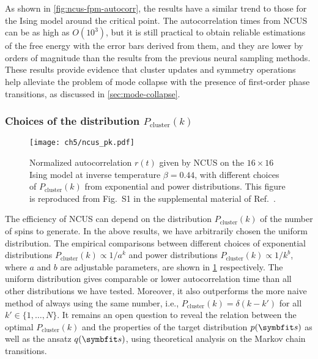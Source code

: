 As shown in \cref{fig:ncus-fpm-autocorr}, the results have a similar trend to those for the Ising model around the critical point. The autocorrelation times from NCUS can be as high as $O(10^3)$, but it is still practical to obtain reliable estimations of the free energy with the error bars derived from them, and they are lower by orders of magnitude than the results from the previous neural sampling methods. These results provide evidence that cluster updates and symmetry operations help alleviate the problem of mode collapse with the presence of first-order phase transitions, as discussed in \cref{sec:mode-collapse}.

\subsubsection{Choices of the distribution $P_\text{cluster}(k)$}

\begin{figure}[htb]
\centering
\texttt{[image: ch5/ncus\_pk.pdf]}
\caption[Choices of the distribution $P_\text{cluster}(k)$ in NCUS]{
Normalized autocorrelation $r(t)$ given by NCUS on the $16 \times 16$ Ising model at inverse temperature $\beta = 0.44$, with different choices of $P_\text{cluster}(k)$ from exponential and power distributions.
This figure is reproduced from Fig.~S1 in the supplemental material of Ref.~\cite{wu2021unbiased}.
}
\label{fig:ncus-pk}
\end{figure}

The efficiency of NCUS can depend on the distribution $P_\text{cluster}(k)$ of the number of spins to generate. In the above results, we have arbitrarily chosen the uniform distribution. The empirical comparisons between different choices of exponential distributions $P_\text{cluster}(k) \propto 1 / a^k$ and power distributions $P_\text{cluster}(k) \propto 1 / k^b$, where $a$ and $b$ are adjustable parameters, are shown in \cref{fig:ncus-pk} respectively. The uniform distribution gives comparable or lower autocorrelation time than all other distributions we have tested. Moreover, it also outperforms the more naive method of always using the same number, i.e., $P_\text{cluster}(k) = \delta(k - k')$ for all $k' \in \{1, \ldots, N\}$. It remains an open question to reveal the relation between the optimal $P_\text{cluster}(k)$ and the properties of the target distribution $p(\vs)$ as well as the ansatz $q(\vs)$, using theoretical analysis on the Markov chain transitions.

